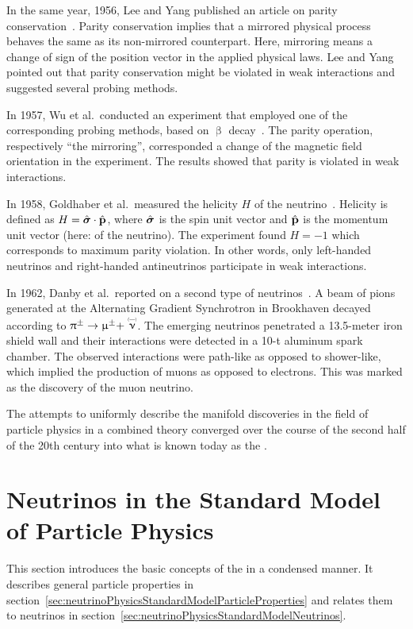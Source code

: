 In the same year, 1956, Lee and Yang published an article on parity conservation~\cite{Lee1956}. Parity conservation implies that a mirrored physical process behaves the same as its non-mirrored counterpart. Here, mirroring means a change of sign of the position vector in the applied physical laws. Lee and Yang pointed out that parity conservation might be violated in weak interactions and suggested several probing methods. 

In 1957, Wu et al.~conducted an experiment that employed one of the corresponding probing methods, based on $\upbeta$ decay~\cite{Wu1957}. The parity operation, respectively ``the mirroring'', corresponded a change of the magnetic field orientation in the experiment. The results showed that parity is violated in weak interactions. 

In 1958, Goldhaber et al.~measured the helicity $H$ of the neutrino~\cite{Goldhaber1958}. Helicity is defined as $ H = \hat{\boldsymbol{\mathbf{\sigma}}} \cdot \hat{\boldsymbol{\mathbf{p}}}$, where $\hat{\boldsymbol{\mathbf{\sigma}}}$ is the spin unit vector and $\hat{\boldsymbol{\mathbf{p}}}$ is the momentum unit vector (here: of the neutrino). The experiment found $H = -1$ which corresponds to maximum parity violation. In other words, only left-handed neutrinos and right-handed antineutrinos participate in weak interactions.

In 1962, Danby et al.~reported on a second type of neutrinos~\cite{Danby1962}. A beam of pions generated at the Alternating Gradient Synchrotron in Brookhaven decayed according to $\uppi^{\pm} \rightarrow \upmu^{\pm} + \maybeaneutrino$. The emerging neutrinos penetrated a 13.5-meter iron shield wall and their interactions were detected in a 10-t aluminum spark chamber. The observed interactions were path-like as opposed to shower-like, which implied the production of muons as opposed to electrons. This was marked as the discovery of the muon neutrino.

The attempts to uniformly describe the manifold discoveries in the field of particle physics in a combined theory converged over the course of the second half of the 20th century into what is known today as the .
    
\section{Neutrinos in the Standard Model of Particle Physics}
\label{sec:neutrinoPhysicsStandardModel}
This section introduces the basic concepts of the  in a condensed manner. It describes general particle properties in section~\ref{sec:neutrinoPhysicsStandardModelParticleProperties} and relates them to neutrinos in section~\ref{sec:neutrinoPhysicsStandardModelNeutrinos}.

